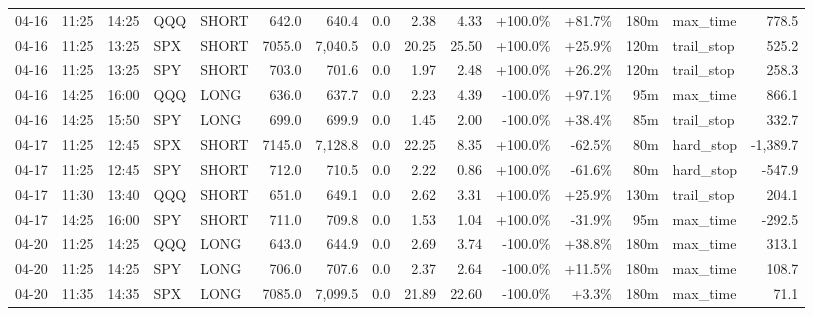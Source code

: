 \documentclass[11pt,a4paper,twoside]{article}
\begin{document}
\begin{landscape}
\begin{center}
\begin{longtable}{>{\color{txtmain}}l l l l l r r r r r r r r >{\color{txtmain}}l r}
04-16 & 11:25 & 14:25 & QQQ & SHORT & 642.0 & 640.4 & 0.0 & 2.38 & 4.33 & \textcolor{wingreen}{+100.0\%} & \textcolor{wingreen}{+81.7\%} & 180m & max\_time & \textcolor{wingreen}{778.5} \\
04-16 & 11:25 & 13:25 & SPX & SHORT & 7055.0 & 7,040.5 & 0.0 & 20.25 & 25.50 & \textcolor{wingreen}{+100.0\%} & \textcolor{wingreen}{+25.9\%} & 120m & trail\_stop & \textcolor{wingreen}{525.2} \\
04-16 & 11:25 & 13:25 & SPY & SHORT & 703.0 & 701.6 & 0.0 & 1.97 & 2.48 & \textcolor{wingreen}{+100.0\%} & \textcolor{wingreen}{+26.2\%} & 120m & trail\_stop & \textcolor{wingreen}{258.3} \\
04-16 & 14:25 & 16:00 & QQQ & LONG & 636.0 & 637.7 & 0.0 & 2.23 & 4.39 & \textcolor{lossred}{-100.0\%} & \textcolor{wingreen}{+97.1\%} & 95m & max\_time & \textcolor{wingreen}{866.1} \\
04-16 & 14:25 & 15:50 & SPY & LONG & 699.0 & 699.9 & 0.0 & 1.45 & 2.00 & \textcolor{lossred}{-100.0\%} & \textcolor{wingreen}{+38.4\%} & 85m & trail\_stop & \textcolor{wingreen}{332.7} \\
04-17 & 11:25 & 12:45 & SPX & SHORT & 7145.0 & 7,128.8 & 0.0 & 22.25 & 8.35 & \textcolor{wingreen}{+100.0\%} & \textcolor{lossred}{-62.5\%} & 80m & hard\_stop & \textcolor{lossred}{-1,389.7} \\
04-17 & 11:25 & 12:45 & SPY & SHORT & 712.0 & 710.5 & 0.0 & 2.22 & 0.86 & \textcolor{wingreen}{+100.0\%} & \textcolor{lossred}{-61.6\%} & 80m & hard\_stop & \textcolor{lossred}{-547.9} \\
04-17 & 11:30 & 13:40 & QQQ & SHORT & 651.0 & 649.1 & 0.0 & 2.62 & 3.31 & \textcolor{wingreen}{+100.0\%} & \textcolor{wingreen}{+25.9\%} & 130m & trail\_stop & \textcolor{wingreen}{204.1} \\
04-17 & 14:25 & 16:00 & SPY & SHORT & 711.0 & 709.8 & 0.0 & 1.53 & 1.04 & \textcolor{wingreen}{+100.0\%} & \textcolor{lossred}{-31.9\%} & 95m & max\_time & \textcolor{lossred}{-292.5} \\
04-20 & 11:25 & 14:25 & QQQ & LONG & 643.0 & 644.9 & 0.0 & 2.69 & 3.74 & \textcolor{lossred}{-100.0\%} & \textcolor{wingreen}{+38.8\%} & 180m & max\_time & \textcolor{wingreen}{313.1} \\
04-20 & 11:25 & 14:25 & SPY & LONG & 706.0 & 707.6 & 0.0 & 2.37 & 2.64 & \textcolor{lossred}{-100.0\%} & \textcolor{wingreen}{+11.5\%} & 180m & max\_time & \textcolor{wingreen}{108.7} \\
04-20 & 11:35 & 14:35 & SPX & LONG & 7085.0 & 7,099.5 & 0.0 & 21.89 & 22.60 & \textcolor{lossred}{-100.0\%} & \textcolor{wingreen}{+3.3\%} & 180m & max\_time & \textcolor{wingreen}{71.1} \\

\end{longtable}
\end{center}
\end{landscape}
\end{document}
